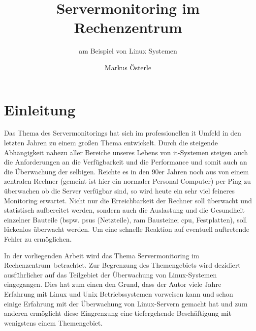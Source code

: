 \documentclass[12pt,a4paper,parskip,listof=totoc,bibliography=totoc]{scrreprt}
\begin{document}
	\subject{Seminararbeit im Studiengang \glqq Verwaltungsinformatik\grqq}
	\author{Markus Österle}
	\title{Servermonitoring im Rechenzentrum}
	\subtitle{am Beispiel von Linux Systemen}
	\publishers{Betreut von Dipl. Inf. Stefan Müller}
	\date{} %

	\maketitle
	
	\tableofcontents
	\onehalfspacing
	\chapter{Einleitung}
	Das Thema des Servermonitorings hat sich im professionellen \acrshort{it} Umfeld in den letzten Jahren zu einem großen Thema entwickelt. Durch die steigende Abhängigkeit nahezu aller Bereiche unseres Lebens von \acrshort{it}-Systemen steigen auch die Anforderungen an die Verfügbarkeit und die Performance und somit auch an die Überwachung der selbigen. Reichte es in den 90er Jahren noch aus von einem zentralen Rechner (gemeint ist hier ein normaler Personal Computer) per Ping zu überwachen ob die Server verfügbar sind, so wird heute ein sehr viel feineres Monitoring erwartet. Nicht nur die Erreichbarkeit der Rechner soll überwacht und statistisch aufbereitet werden, sondern auch die Auslastung und die Gesundheit einzelner Bauteile (bspw. \acrlong{psu}s (Netzteile), \acrshort{ram} Bausteine; \acrshort{cpu}, Festplatten), soll lückenlos überwacht werden. Um eine schnelle Reaktion auf eventuell auftretende Fehler zu ermöglichen. 

	In der vorliegenden Arbeit wird das Thema \glqq Servermonitoring im Rechenzentrum\grqq\ betrachtet. Zur Begrenzung des Themengebiets wird dezidiert ausführlicher auf das Teilgebiet der Überwachung von Linux-Systemen eingegangen. Dies hat zum einen den Grund, dass der Autor viele Jahre Erfahrung mit Linux und Unix Betriebssystemen vorweisen kann und schon einige Erfahrung mit der Überwachung von Linux-Servern gemacht hat und zum anderen ermöglicht diese Eingrenzung eine tiefergehende Beschäftigung mit wenigstens einem Themengebiet.
\end{document}
